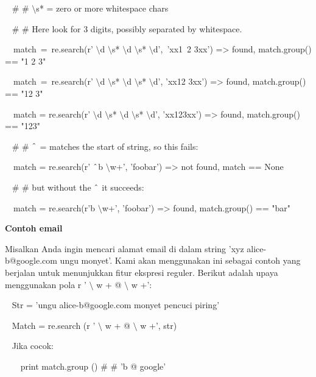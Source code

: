 \begin{12pt}
\begin{12pt}
\begin{12pt}
\begin{12pt}
\begin{12pt}
\begin{12pt}
\begin{12pt}
\vspace{12pt}
\noindent 
~  $  \#  $ $  \#  $  $  \setminus  $s* = zero or more whitespace chars \par
\noindent 
~  $  \#  $ $  \#  $ Here look for 3 digits, possibly separated by whitespace. \par
\noindent 
~~match~=~re.search(r' $  \setminus  $d $  \setminus  $s* $  \setminus  $d $  \setminus  $s* $  \setminus  $d',~'xx1~2   3xx') =>  found, match.group() == "1 2   3" \par
\noindent 
~~match~=~re.search(r' $  \setminus  $d $  \setminus  $s* $  \setminus  $d $  \setminus  $s* $  \setminus  $d', 'xx12  3xx') =>  found, match.group() == "12  3" \par
\noindent 
~~match = re.search(r' $  \setminus  $d $  \setminus  $s* $  \setminus  $d $  \setminus  $s* $  \setminus  $d', 'xx123xx') =>  found, match.group() == "123" \par
\vspace{12pt}
\noindent 
~  $  \#  $ $  \#  $  $  \string^  $ = matches the start of string, so this fails: \par
\noindent 
~~match = re.search(r' $  \string^  $b $  \setminus  $w+', 'foobar') =>  not found, match == None \par
\noindent 
~  $  \#  $ $  \#  $ but without the  $  \string^  $ it succeeds: \par
\noindent 
~~match = re.search(r'b $  \setminus  $w+', 'foobar') =>  found, match.group() == "bar" \par
\vspace{12pt}
\vspace{12pt}
\noindent 
{\fontsize{14pt}{14pt}\selectfont \textbf{Contoh email} \\} \par
Misalkan Anda ingin mencari alamat email di dalam string 'xyz alice-b@google.com ungu monyet'. Kami akan menggunakan ini sebagai contoh yang berjalan untuk menunjukkan fitur ekspresi reguler. Berikut adalah upaya menggunakan pola r ' $  \setminus  $ w + @  $  \setminus  $ w +': \par
\vspace{12pt}
\noindent 
~ Str = 'ungu alice-b@google.com monyet pencuci piring' \par
\noindent 
~ Match = re.search (r ' $  \setminus  $ w + @  $  \setminus  $ w +', str) \par
\noindent 
~ Jika cocok: \par
\noindent 
~~~ print match.group ()  $  \#  $ $  \#  $ 'b @ google' \par

\end{12pt}
\end{12pt}
\end{12pt}
\end{12pt}
\end{12pt}
\end{12pt}
\end{12pt}

